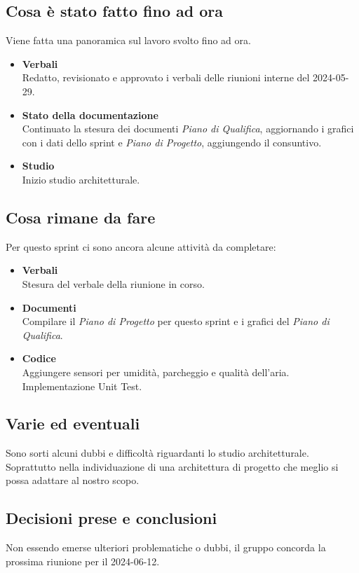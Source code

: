 \documentclass[italian,12pt]{article}
\begin{document}
\subsection{Cosa è stato fatto fino ad ora}
Viene fatta una panoramica sul lavoro svolto fino ad ora.
\begin{itemize}
	\item \textbf{Verbali} \\
		  Redatto, revisionato e approvato i verbali delle riunioni interne del 2024-05-29.
	\item \textbf{Stato della documentazione} \\
		  Continuato la stesura dei documenti \textit{Piano di Qualifica}, aggiornando i grafici con i dati dello sprint e \textit{Piano di Progetto}, aggiungendo il consuntivo.
	\item \textbf{Studio} \\
		  Inizio studio architetturale.
\end{itemize}

\subsection{Cosa rimane da fare}
Per questo sprint ci sono ancora alcune attività da completare:
\begin{itemize}
	\item \textbf{Verbali} \\
		  Stesura del verbale della riunione in corso.
	\item \textbf{Documenti} \\
		  Compilare il \textit{Piano di Progetto} per questo sprint e i grafici del \textit{Piano di Qualifica}.
	\item \textbf{Codice} \\
		  Aggiungere sensori per umidità, parcheggio e qualità dell'aria. Implementazione Unit Test.
\end{itemize}

\subsection{Varie ed eventuali}
Sono sorti alcuni dubbi e difficoltà riguardanti lo studio architetturale. Soprattutto nella individuazione di una architettura di progetto che meglio si possa adattare al nostro scopo.

\subsection{Decisioni prese e conclusioni}
Non essendo emerse ulteriori problematiche o dubbi, il gruppo concorda la prossima riunione per il 2024-06-12.
\end{document}

